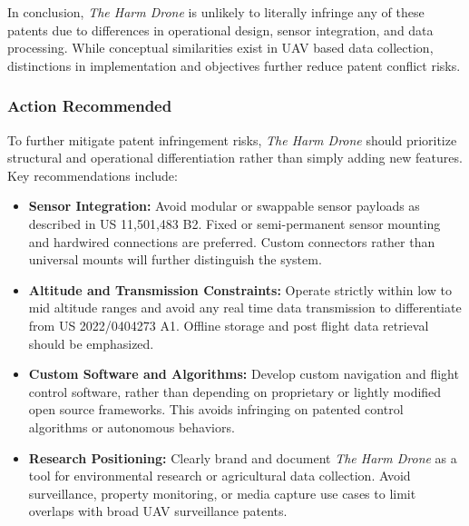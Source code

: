\documentclass[12pt]{article}
\begin{document}
\par In conclusion, \textit{The Harm Drone} is unlikely to literally infringe any of these patents due to differences in operational design, sensor integration, and data processing. While conceptual similarities exist in UAV based data collection, distinctions in implementation and objectives further reduce patent conflict risks.

\subsubsection{Action Recommended}

\par To further mitigate patent infringement risks, \textit{The Harm Drone} should prioritize structural and operational differentiation rather than simply adding new features. Key recommendations include:

\begin{itemize}
    \item \textbf{Sensor Integration:} Avoid modular or swappable sensor payloads as described in US 11,501,483 B2. Fixed or semi-permanent sensor mounting and hardwired connections are preferred. Custom connectors rather than universal mounts will further distinguish the system.
    
    \item \textbf{Altitude and Transmission Constraints:} Operate strictly within low to mid altitude ranges and avoid any real time data transmission to differentiate from US 2022/0404273 A1. Offline storage and post flight data retrieval should be emphasized.

    \item \textbf{Custom Software and Algorithms:} Develop custom navigation and flight control software, rather than depending on proprietary or lightly modified open source frameworks. This avoids infringing on patented control algorithms or autonomous behaviors.

    \item \textbf{Research Positioning:} Clearly brand and document \textit{The Harm Drone} as a tool for environmental research or agricultural data collection. Avoid surveillance, property monitoring, or media capture use cases to limit overlaps with broad UAV surveillance patents.
\end{itemize}
\end{document}
